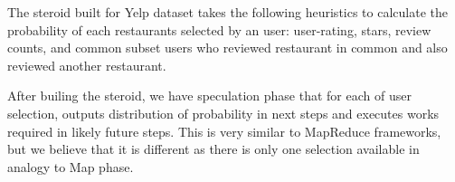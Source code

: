 The steroid built for Yelp dataset takes the following heuristics to calculate
the probability of each restaurants selected by an user: user-rating, stars,
review counts, and common subset users who reviewed restaurant in common and also
reviewed another restaurant. 

After builing the steroid, we have speculation phase that for each of user
selection, outputs distribution of probability in next steps and executes works
required in likely future steps. 
This is very similar to MapReduce frameworks, but we believe that it is
different as there is only one selection available in analogy to Map phase. 



